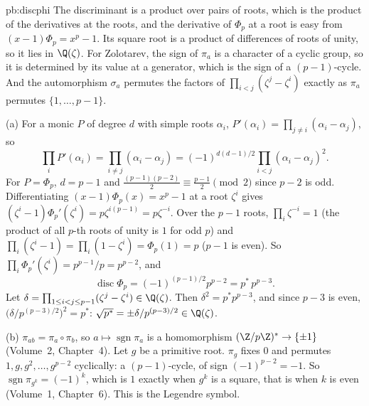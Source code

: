 \begin{solution}{pb:discphi}
\idea The discriminant is a product over pairs of roots, which is the product of the derivatives at the roots, and the
derivative of $\Phi_p$ at a root is easy from $(x-1)\Phi_p=x^p-1$. Its square root is a product of differences of roots of
unity, so it lies in $\Q(\zeta)$. For Zolotarev, the sign of $\pi_a$ is a character of a cyclic group, so it is determined
by its value at a generator, which is the sign of a $(p-1)$-cycle. And the automorphism $\sigma_a$ permutes the factors
of $\prod_{i<j}(\zeta^j-\zeta^i)$ exactly as $\pi_a$ permutes $\{1,\dots,p-1\}$.

\writeup (a) For a monic $P$ of degree $d$ with simple roots $\alpha_i$, $P'(\alpha_i)=\prod_{j\ne i}(\alpha_i-\alpha_j)$, so
\[
\prod_iP'(\alpha_i)=\prod_{i\ne j}(\alpha_i-\alpha_j)=(-1)^{d(d-1)/2}\prod_{i<j}(\alpha_i-\alpha_j)^2.
\]
For $P=\Phi_p$,
$d=p-1$ and $\frac{(p-1)(p-2)}2\equiv\frac{p-1}2\pmod2$ since $p-2$ is odd. Differentiating $(x-1)\Phi_p(x)=x^p-1$ at a root
$\zeta^i$ gives $(\zeta^i-1)\Phi_p'(\zeta^i)=p\zeta^{i(p-1)}=p\zeta^{-i}$. Over the $p-1$ roots,
$\prod_i\zeta^{-i}=1$ (the product of all $p$-th roots of unity is $1$ for odd $p$) and
$\prod_i(\zeta^i-1)=\prod_i(1-\zeta^i)=\Phi_p(1)=p$ ($p-1$ is even). So $\prod_i\Phi_p'(\zeta^i)=p^{p-1}/p=p^{p-2}$, and
\[
\operatorname{disc}\Phi_p=(-1)^{(p-1)/2}p^{p-2}=p^*\,p^{p-3}.
\]
Let $\delta=\prod_{1\le i<j\le p-1}(\zeta^j-\zeta^i)\in\Q(\zeta)$. Then $\delta^2=p^*p^{p-3}$, and since $p-3$ is even,
$\bigl(\delta/p^{(p-3)/2}\bigr)^2=p^*$: $\sqrt{p^*}=\pm\delta/p^{(p-3)/2}\in\Q(\zeta)$.

(b) $\pi_{ab}=\pi_a\circ\pi_b$, so $a\mapsto\operatorname{sgn}\pi_a$ is a homomorphism $(\Z/p\Z)^*\to\{\pm1\}$ (Volume~2, Chapter~4).
Let $g$ be a primitive root. $\pi_g$ fixes $0$ and permutes $1,g,g^2,\dots,g^{p-2}$ cyclically: a $(p-1)$-cycle, of sign
$(-1)^{p-2}=-1$. So $\operatorname{sgn}\pi_{g^k}=(-1)^k$, which is $1$ exactly when $g^k$ is a square, that is when $k$ is
even (Volume~1, Chapter~6). This is the Legendre symbol.


\end{solution}
